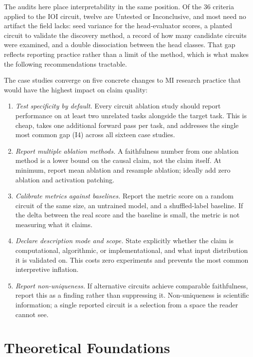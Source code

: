 \documentclass{article}
\begin{document}
The audits here place interpretability in the same position. Of the 36 criteria applied to the IOI circuit, twelve are Untested or Inconclusive, and most need no artifact the field lacks: seed variance for the head-evaluator scores, a planted circuit to validate the discovery method, a record of how many candidate circuits were examined, and a double dissociation between the head classes. That gap reflects reporting practice rather than a limit of the method, which is what makes the following recommendations tractable.

The case studies converge on five concrete changes to MI research practice that would have the highest impact on claim quality:
\begin{enumerate}[nosep]
\item \emph{Test specificity by default.} Every circuit ablation study should report performance on at least two unrelated tasks alongside the target task. This is cheap, takes one additional forward pass per task, and addresses the single most common gap (I4) across all sixteen case studies.
\item \emph{Report multiple ablation methods.} A faithfulness number from one ablation method is a lower bound on the causal claim, not the claim itself. At minimum, report mean ablation and resample ablation; ideally add zero ablation and activation patching.
\item \emph{Calibrate metrics against baselines.} Report the metric score on a random circuit of the same size, an untrained model, and a shuffled-label baseline. If the delta between the real score and the baseline is small, the metric is not measuring what it claims.
\item \emph{Declare description mode and scope.} State explicitly whether the claim is computational, algorithmic, or implementational, and what input distribution it is validated on. This costs zero experiments and prevents the most common interpretive inflation.
\item \emph{Report non-uniqueness.} If alternative circuits achieve comparable faithfulness, report this as a finding rather than suppressing it. Non-uniqueness is scientific information; a single reported circuit is a selection from a space the reader cannot see.
\end{enumerate}


\section{Theoretical Foundations}
\label{sec:foundations}
\end{document}
